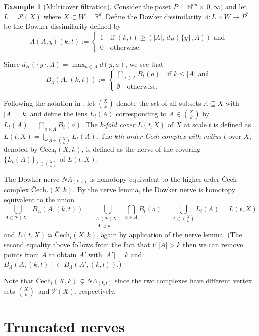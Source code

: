 \documentclass[10pt,a4paper]{article}
\theoremstyle{definition}
\newtheorem{ex}{Example}[thm]
\newcommand{\R}{\mathbb{R}}
\newcommand{\N}{\mathbb{N}}
\begin{document}
\begin{ex}[Multicover filtration]
	Consider the poset $P=\N^{op}\times[0,\infty)$ and let $L=\mathcal{P}(X)$ where $X\subset W=\R^d$. Define the Dowker dissimilarity $\Lambda\colon L\times W\to P^*$ be the Dowker dissimilarity defined by
	$$
	\Lambda(A,y)(k,t) := \begin{cases}
		1\quad\text{if }(k,t)\geq(|A|,\,d_H(\{y\},A))\text{ and}\\
		0\quad\text{otherwise.}
	\end{cases}
	$$
	
	Since $d_H(\{y\}, A)=\max_{a\in A}d(y,a)$, we see that
	$$
	B_\Lambda(A,(k,t)):=\begin{cases}
		\bigcap_{a\in A}B_t(a)\quad\text{if }k\leq |A| \text{ and}\\
		\emptyset\quad\text{otherwise.}
	\end{cases}
	$$
	
	Following the notation in \autocite{buchet2023sparse}, let $\binom{X}{k}$ denote the set of all subsets $A\subseteq X$ with $|A|=k$, and define the lens $L_t(A)$ corresponding to $A\in\binom{X}{k}$ by $L_t(A)=\bigcap_{a\in A}B_t(a)$. The \textit{$k$-fold cover} $L(t,X)$ of $X$ at scale $t$ is defined as $L(t,X)=\bigcup_{A\in\binom{X}{k}}L_t(A)$. The \textit{$k$th order Čech complex with radius} $t$ over $X$, denoted by $\text{\v{C}ech}_t(X,k)$, is defined as the nerve of the covering $\{L_t(A)\}_{A\in\binom{X}{k}}$ of $L(t, X)$.
	
	The Dowker nerve $N\Lambda_{(k,t)}$ is homotopy equivalent to the higher order Čech complex $\text{\v{C}ech}_t(X,k)$. By the nerve lemma, the Dowker nerve is homotopy equivalent to the union 
	$$
	\bigcup_{A\in\mathcal{P}(X)}B_\Lambda(A,(k,t)) = \bigcup_{\substack{A\in\mathcal{P}(X)\\|A|\geq k}}\bigcap_{a\in A}B_t(a) = \bigcup_{A\in\binom{X}{k}}L_t(A) = L(t,X)
	$$
	and $L(t,X)\simeq\text{\v{C}ech}_t(X,k)$, again by application of the nerve lemma. (The second equality above follows from the fact that if $|A|>k$ then we can remove points from $A$ to obtain $A'$ with $|A'|=k$ and $B_\Lambda(A,(k,t))\subset B_\Lambda(A',(k,t))$.)
	
	Note that $\text{\v{C}ech}_t(X,k)\subsetneq N\Lambda_{(k,t)}$ since the two complexes have different vertex sets $\binom{X}{k}$ and $\mathcal{P}(X)$, respectively.
\end{ex}

\section{Truncated nerves}
\end{document}
